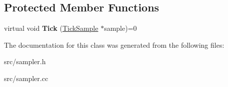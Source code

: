 \subsection*{Protected Member Functions}
\begin{DoxyCompactItemize}
\item 
\hypertarget{classv8_1_1internal_1_1_sampler_a483bcf8623bba0a41f5d769291f9848f}{}virtual void {\bfseries Tick} (\hyperlink{structv8_1_1internal_1_1_tick_sample}{Tick\+Sample} $\ast$sample)=0\label{classv8_1_1internal_1_1_sampler_a483bcf8623bba0a41f5d769291f9848f}

\end{DoxyCompactItemize}


The documentation for this class was generated from the following files\+:\begin{DoxyCompactItemize}
\item 
src/sampler.\+h\item 
src/sampler.\+cc\end{DoxyCompactItemize}
